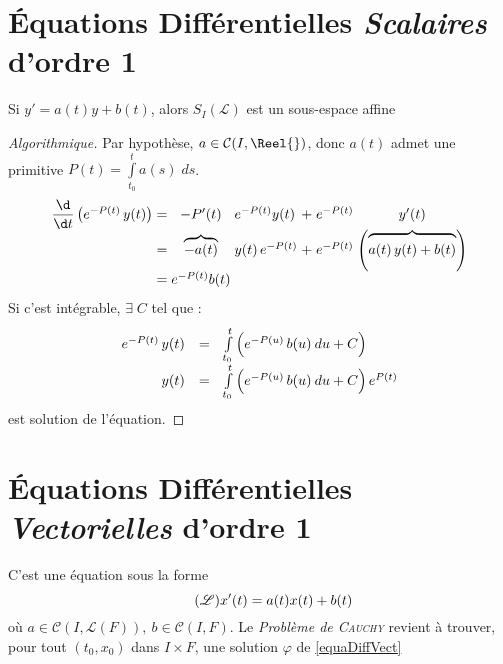 \documentclass[11pt,a4paper,fleqn,pdftex]{report}
\begin{document}
\section{Équations Différentielles \emph{Scalaires} d'ordre 1}
\begin{theorem}
Si $y'=a(t) y + b(t)$, alors $S_I(\mathscr{L})$ est un sous-espace affine
\end{theorem}
\begin{proof}[Algorithmique]\label{ResolEquDiffScal1}
Par hypothèse, $a \in \mathcal{C}(I,\Reel{})$, donc $a(t)$ admet une primitive $P(t)=\int \limits_{t_0}^t a(s) \; ds$.
\[\arraycolsep=1.4pt\def\arraystretch{1}
\begin{array}{r c c l l c c}
\dfrac{\d}{\d t}\left( e^{-P(t)}\, y(t) \right) &=& -P'(t) & e^{-P(t)}y(t) &+& e^{-P(t)}& y'(t)\\
&=& \overbrace{-a(t)}&y(t)\, e^{-P(t)}&+& e^{-P(t)} &\left( \overbrace{\vphantom{{3^3}^3} a(t)\, y(t) +b(t)} \right)\\
&=& e^{-P(t)}b(t)\\
\end{array}\]
Si c'est intégrable, $\exists \; C$ tel que :
\[
\begin{array}{r c l}
e^{-P(t)}\, y(t) &=& \int \limits_{t_0}^t \left( \vphantom{{3^3}^3} e^{-P(u)}\, b(u) \: du + C \right)\\
y(t) &=& \int\limits_{t_0}^t \left( \vphantom{{3^3}^3} e^{-P(u)}\, b(u) \: du + C \right) e^{P(t)}
\end{array}
\] est solution de l'équation.
\end{proof}

\section{Équations Différentielles \emph{Vectorielles} d'ordre 1}

\begin{dfn}
    C'est une équation sous la forme 
\begin{equation}\label{equaDiffVect}\tag{$\mathscr{L}$}
    x'(t) = a(t) x(t) + b(t)
\end{equation}
où $a \in \mathcal{C}\left( I,\mathscr{L}(F)\right), \: b\in \mathcal{C}(I,F)$. Le \emph{Problème de \textsc{Cauchy}}  revient à trouver, pour tout $(t_0,x_0)$ dans $I \times F$, une solution $\varphi$ de \eqref{equaDiffVect}
\end{dfn}
\end{document}
